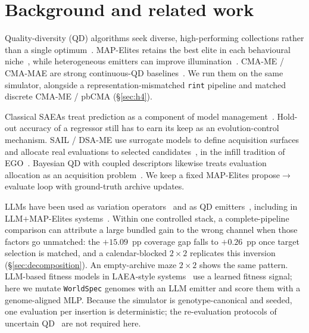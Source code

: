 \documentclass[preprint,12pt]{elsarticle}
\begin{document}
\section{Background and related work}
\label{sec:related}

Quality-diversity (QD) algorithms seek diverse, high-performing collections rather than a single optimum~\cite{pugh2016quality,cully2018quality,chatzilygeroudis2021qd}. MAP-Elites retains the best elite in each behavioural niche~\cite{mouret2015illuminating}, while heterogeneous emitters can improve illumination~\cite{cully2020multiemitter}. CMA-ME / CMA-MAE are strong continuous-QD baselines~\cite{fontaine2020cmame,fontaine2023cmamae,zhao2024cmamae,pyribs2020}. We run them on the same simulator, alongside a representation-mismatched \texttt{rint} pipeline and matched discrete CMA-ME / pbCMA (\S\ref{sec:h4}).

Classical SAEAs treat prediction as a component of model management~\cite{jin2005fitness}. Hold-out accuracy of a regressor still has to earn its keep as an evolution-control mechanism. SAIL / DSA-ME use surrogate models to define acquisition surfaces and allocate real evaluations to selected candidates~\cite{gaier2018sail,gaier2017sail,grillotti2022dsame}, in the infill tradition of EGO~\cite{jones1998ego}. Bayesian QD with coupled descriptors likewise treats evaluation allocation as an acquisition problem~\cite{kent2025boqd}. We keep a fixed MAP-Elites propose$\rightarrow$evaluate loop with ground-truth archive updates.

LLMs have been used as variation operators~\cite{wu2025ecllm,lehman2023openelm,romera2024funsearch} and as QD emitters~\cite{nasir2024llmatic,lim2024llmqd}, including in LLM$+$MAP-Elites systems~\cite{ropke2026dejaq,sviridov2026medical}. Within one controlled stack, a complete-pipeline comparison can attribute a large bundled gain to the wrong channel when those factors go unmatched: the $+15.09$~pp coverage gap falls to $+0.26$~pp once target selection is matched, and a calendar-blocked $2\times2$ replicates this inversion (\S\ref{sec:decomposition}). An empty-archive maze $2\times2$ shows the same pattern. LLM-based fitness models in LAEA-style systems~\cite{hao2024laea,xie2025llmsae} use a learned fitness signal; here we mutate \texttt{WorldSpec} genomes with an LLM emitter and score them with a genome-aligned MLP. Because the simulator is genotype-canonical and seeded, one evaluation per insertion is deterministic; the re-evaluation protocols of uncertain QD~\cite{flageat2023uq,flageat2025extractqd} are not required here.
\end{document}
